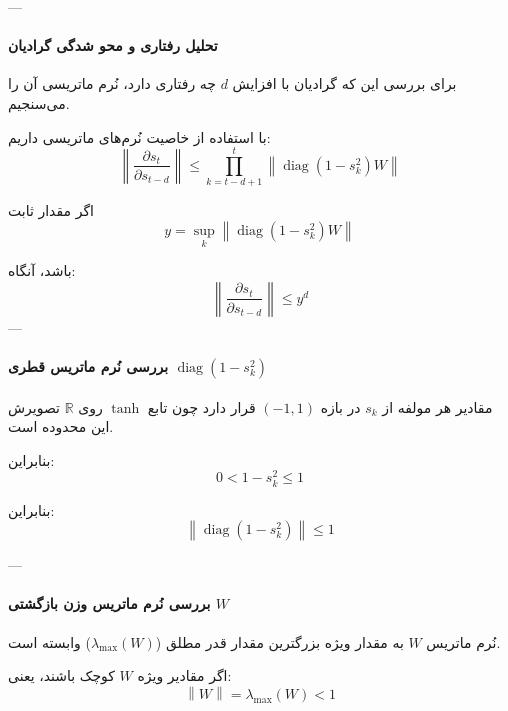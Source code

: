 \documentclass{article}
\begin{document}
---

\paragraph{تحلیل رفتاری و محو شدگی گرادیان}

برای بررسی این که گرادیان با افزایش \(d\) چه رفتاری دارد، نُرم ماتریسی آن را می‌سنجیم.

با استفاده از خاصیت نُرم‌های ماتریسی داریم:
\begin{equation}
	\left\| \frac{\partial s_t}{\partial s_{t-d}} \right\| \leq \prod_{k=t-d+1}^t \left\| \operatorname{diag}\left(1 - s_k^2\right) W \right\|
\end{equation}

اگر مقدار ثابت
\begin{equation}
y = \sup_{k} \left\| \operatorname{diag}(1-s_k^2) W \right\|
\end{equation}

باشد، آنگاه:
\begin{equation}
\left\| \frac{\partial s_t}{\partial s_{t-d}} \right\| \leq y^d
\end{equation}
---

\paragraph{بررسی نُرم ماتریس قطری \(\operatorname{diag}(1 - s_k^2)\)}

مقادیر هر مولفه از \(s_k\) در بازه \(\left(-1, 1\right)\) قرار دارد چون تابع \(\tanh\) روی \(\mathbb{R}\) تصویرش این محدوده است.

بنابراین:
\begin{equation}
0 < 1 - s_k^2 \leq 1
\end{equation}

بنابراین:
\begin{equation}
\left\| \operatorname{diag}(1 - s_k^2) \right\| \leq 1
\end{equation}

---

\paragraph{بررسی نُرم ماتریس وزن بازگشتی \(W\)}

نُرم ماتریس \(W\) به مقدار ویژه بزرگترین مقدار قدر مطلق (\(\lambda_{\max}(W)\)) وابسته است.

اگر مقادیر ویژه \(W\) کوچک باشند، یعنی:
\begin{equation}
\left\| W \right\| = \lambda_{\max}(W) < 1
\end{equation}
\end{document}
